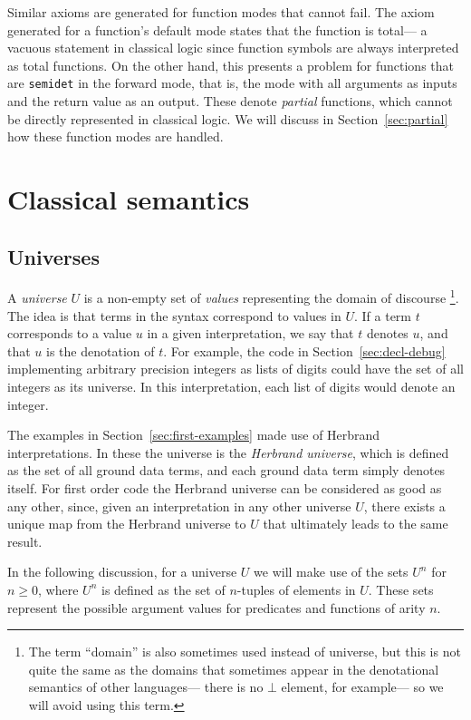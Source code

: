 Similar axioms are generated for function modes that cannot fail.
The axiom generated for a function's default mode
states that the function is total---%
a vacuous statement in classical logic
since function symbols are always interpreted as total functions.
On the other hand,
this presents a problem for functions
that are \texttt{semidet} in the forward mode,
that is, the mode with all arguments as inputs
and the return value as an output.
These denote \emph{partial} functions,
which cannot be directly represented in classical logic.
We will discuss in Section~\ref{sec:partial}
how these function modes are handled.


\section{Classical semantics}
\label{sec:classical}

\subsection{Universes}

A \emph{universe} $U$ is a non-empty set of \emph{values\label{gi:value}}
representing the domain of discourse%
\footnote{
The term ``domain'' is also sometimes used instead of universe,
but this is not quite the same as the domains that sometimes appear
in the denotational semantics of other languages---%
there is no $\bot$ element, for example---%
so we will avoid using this term.
}.
The idea is that terms in the syntax
correspond to values in $U$.
If a term $t$ corresponds to a value $u$
in a given interpretation,
we say that $t$ denotes $u$,
and that $u$ is the denotation of $t$.
For example,
the code in Section~\ref{sec:decl-debug}
implementing arbitrary precision integers as lists of digits
could have the set of all integers as its universe.
In this interpretation,
each list of digits would denote an integer.

The examples in Section~\ref{sec:first-examples}
made use of Herbrand interpretations.
In these the universe is the
\emph{Herbrand universe\label{gi:herbrand-universe}},
which is defined as the set of all ground data terms,
and each ground data term simply denotes itself.
For first order code
the Herbrand universe can be considered as good as any other,
since, given an interpretation in any other universe $U$,
there exists a unique map
from the Herbrand universe to $U$
that ultimately leads to the same result.

In the following discussion,
for a universe $U$
we will make use of the sets $U^n$ for $n \geqslant 0$,
where $U^n$ is defined as the set of $n$-tuples of elements in $U$.
These sets represent the possible argument values
for predicates and functions of arity $n$.


